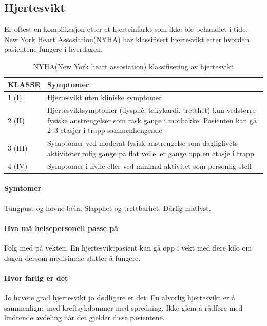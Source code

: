			\subsection{Hjertesvikt}
				Er oftest en komplikasjon etter et hjerteinfarkt som ikke ble behandlet i tide. New York Heart Assosiation(NYHA) har klassifisert hjertesvikt etter hvordan pasientene fungere i hverdagen. 
					\begin{table}[ht]
						\caption{NYHA(New York heart assosiation) klassifisering av hjertesvikt}
						\centering
						\begin{tabular}{|p{2cm}| p{11cm}|}
							\hline
							\textbf{KLASSE} & \textbf{Symptomer}\\[0.75pt]
							\hline
							1 (I) & Hjertesvikt uten kliniske symptomer\\
							\hline
							2 (II) & Hjertesviktsymptomer (dyspné, takykardi, tretthet) kun ved\newline større fysiske anstrengelser som rask gange i motbakke. \newline Pasienten kan gå 2–3 etasjer i trapp sammenhengende\\
							\hline
							3 (III) & Symptomer ved moderat fysisk anstrengelse som dagliglivets aktiviteter,rolig gange på flat vei eller gange opp en etasje i trapp\\
							\hline
							4 (IV) & Symptomer i hvile eller ved minimal aktivitet som personlig stell \\
							\hline
						\end{tabular}
					\end{table}
				\paragraph{Symtomer\\}
					Tungpust og hovne bein. Slapphet og trettbarhet. Dårlig matlyst.
				\paragraph{Hva må helsepersonell passe på\\}
					Følg med på vekten. En hjertesviktpasient kan gå opp i vekt med flere kilo om dagen dersom medisinene slutter å fungere. 
				\paragraph{Hvor farlig er det\\}
					Jo høyere grad hjertesvikt jo dødligere er det. En alvorlig hjertesvikt er å sammenligne med kreftsykdommer med spredning. Ikke glem å rådføre med lindrende avdeling når det gjelder disse pasientene.
